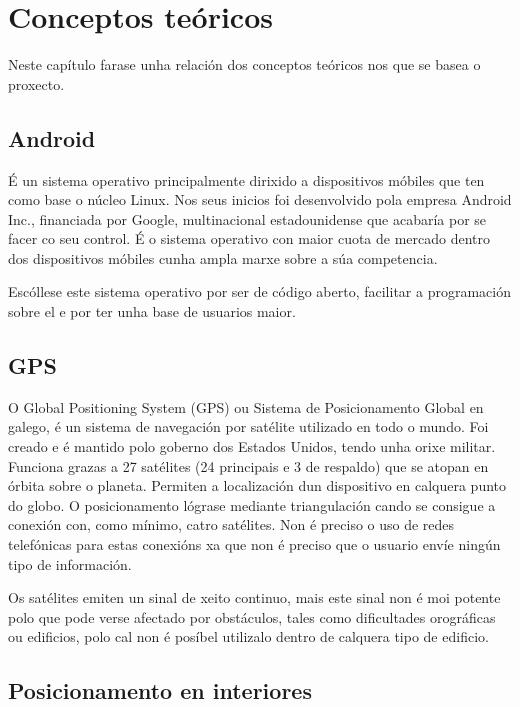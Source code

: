 \chapter{Conceptos teóricos}

Neste capítulo farase unha relación dos conceptos teóricos nos que se basea o proxecto.


\section{Android}

É un sistema operativo principalmente dirixido a dispositivos móbiles que ten como base o núcleo Linux. Nos seus inicios foi desenvolvido pola empresa Android Inc., financiada por Google, multinacional estadounidense que acabaría por se facer co seu control. É o sistema operativo con maior cuota de mercado dentro dos dispositivos móbiles cunha ampla marxe sobre a súa competencia.

Escóllese este sistema operativo por ser de código aberto, facilitar a programación sobre el e por ter unha base de usuarios maior.


\section{GPS}

O Global Positioning System (GPS) ou Sistema de Posicionamento Global en galego, é un sistema de navegación por satélite utilizado en todo o mundo. Foi creado e é mantido polo goberno dos Estados Unidos, tendo unha orixe militar. Funciona grazas a 27 satélites (24 principais e 3 de respaldo) que se atopan en órbita sobre o planeta. Permiten a localización dun dispositivo en calquera punto do globo. O posicionamento lógrase mediante triangulación cando se consigue a conexión con, como mínimo, catro satélites. Non é preciso o uso de redes telefónicas para estas conexións xa que non é preciso que o usuario envíe ningún tipo de información.

Os satélites emiten un sinal de xeito continuo, mais este sinal non é moi potente polo que pode verse afectado por obstáculos, tales como dificultades orográficas ou edificios, polo cal non é posíbel utilizalo dentro de calquera tipo de edificio.


\section{Posicionamento en interiores}

